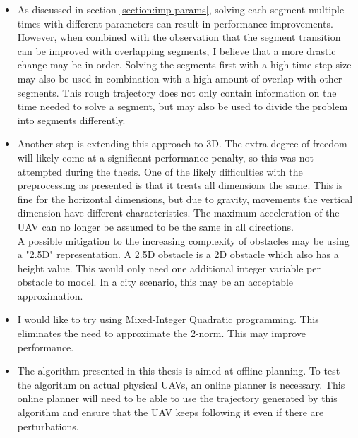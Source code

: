 \begin{itemize}
\item As discussed in section \ref{section:imp-params}, solving each segment multiple times with different parameters can result in performance improvements. However, when combined with the observation that the segment transition can be improved with overlapping segments, I believe that a more drastic change may be in order. Solving the segments first with a high time step size may also be used in combination with a high amount of overlap with other segments. This rough trajectory does not only contain information on the time needed to solve a segment, but may also be used to divide the problem into segments differently.
\item Another step is extending this approach to 3D. The extra degree of freedom will likely come at a significant performance penalty, so this was not attempted during the thesis. One of the likely difficulties with the preprocessing as presented is that it treats all dimensions the same. This is fine for the horizontal dimensions, but due to gravity, movements the vertical dimension have different characteristics. The maximum acceleration of the UAV can no longer be assumed to be the same in all directions.\\
A possible mitigation to the increasing complexity of obstacles may be using a "2.5D" representation. A 2.5D obstacle is a 2D obstacle which also has a height value. This would only need one additional integer variable per obstacle to model. In a city scenario, this may be an acceptable approximation.
\item I would like to try using Mixed-Integer Quadratic programming. This eliminates the need to approximate the 2-norm. This may improve performance.
\item The algorithm presented in this thesis is aimed at offline planning. To test the algorithm on actual physical UAVs, an online planner is necessary. This online planner will need to be able to use the trajectory generated by this algorithm and ensure that the UAV keeps following it even if there are perturbations.
\end{itemize}

